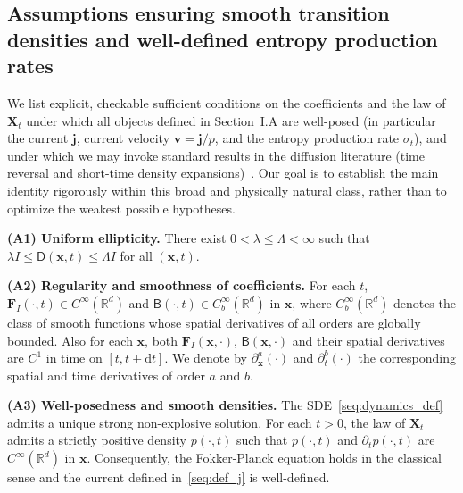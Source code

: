 \documentclass[
 longbibliography,
 twocolumn,
 superscriptaddress,
 amsmath,
 amssymb,
 amsthm,
 amsfonts,
 prl,
 floatfix,
]{revtex4-2}
\newcommand{\matbf}[1]{\boldsymbol{\mathsf{#1}}}
\begin{document}
\begin{widetext}
\subsection{Assumptions ensuring smooth transition densities and well-defined entropy production rates}
\vspace*{-0.8\baselineskip}
We list explicit, checkable sufficient conditions on the coefficients and the law of $\bm{X}_t$ under which all objects defined in Section~I.A are well-posed (in particular the current $\bm{j}$, current velocity $\bm{v}=\bm{j}/p$, and the entropy production rate $\sigma_t$), and under which we may invoke standard results in the diffusion literature (time reversal and short-time density expansions)~\cite{anderson1982reverse,haussmann1986time,li2013maximum,watanabe1987analysis,yang2019anew,kloeden1992numerical,maruyama1955continuous,yoshida1992asymptotic,higa2013estimates,bally2015probabilistic}. Our goal is to establish the main identity rigorously within this broad and physically natural class, rather than to optimize the weakest possible hypotheses.

\medskip
\hypertarget{assumption:A1}{}
\noindent\textbf{(A1) Uniform ellipticity.} There exist $0<\lambda\leq\Lambda<\infty$ such that $\lambda I\leq\matbf{D}(\bm{x},t)\leq\Lambda I$ for all $(\bm{x},t)$.

\bigskip
\hypertarget{assumption:A2}{}
\noindent\textbf{(A2) Regularity and smoothness of coefficients.}
For each $t$, $\bm{F}_I(\cdot,t)\in C^\infty(\mathbb{R}^d)$ and
$\matbf{B}(\cdot,t)\in C_b^\infty(\mathbb{R}^d)$ in $\bm{x}$, where $C_b^\infty(\mathbb{R}^d)$ denotes the class of smooth functions
whose spatial derivatives of all orders are globally bounded. Also for each $\bm x$, both $\bm F_I(\bm x,\cdot)$, $\matbf B(\bm x,\cdot)$ and their spatial derivatives are $C^1$ in time on $[t,t+\mathrm dt]$.
We denote by $\partial_{\bm{x}}^a (\cdot)$
and $\partial_{t}^b(\cdot)$ the corresponding spatial and time derivatives of order $a$ and $b$.


\bigskip
\hypertarget{assumption:A3}{}
\noindent\textbf{(A3) Well-posedness and smooth densities.}
The SDE~\eqref{seq:dynamics_def} admits 
a unique strong non-explosive solution. For each $t>0$, the law of $\bm{X}_t$ admits a strictly positive density $p(\cdot,t)$ such that $p(\cdot,t)$ and $\partial_t p(\cdot, t)$ are $C^\infty(\mathbb{R}^d)$ in $\bm x$. Consequently, the Fokker-Planck equation holds in the classical sense and the current defined in~\eqref{seq:def_j} is well-defined.


\end{widetext}
\end{document}

